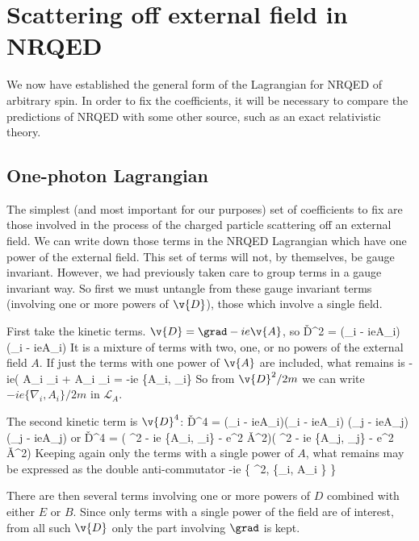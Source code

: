 


\section{Scattering off external field in NRQED}
We now have established the general form of the Lagrangian for NRQED of arbitrary spin.  In order to fix the coefficients, it will be necessary to compare the predictions of NRQED with some other source, such as an exact relativistic theory.


\subsection{One-photon Lagrangian}
The simplest (and most important for our purposes) set of coefficients to fix are those involved in the process of the charged particle scattering off an external field.  We can write down those terms in the NRQED Lagrangian which have one power of the external field.  This set of terms will not, by themselves, be gauge invariant.  However, we had previously taken care to group terms in a gauge invariant way.  So first we must untangle from these gauge invariant terms (involving one or more powers of $\v{D}$), those which involve a single field.


First take the kinetic terms.  $\v{D} = \grad - ie\v{A}$, so
\beq
	\v{D}^2 = (\nabla_i - ieA_i)(\nabla_i - ieA_i)
\eeq
It is a mixture of terms with two, one, or no powers of the external field $A$.  If just the terms with one power of $\v{A}$ are included, what remains is
\beq
	-ie( A_i \nabla_i + A_i \nabla_i = -ie \{A_i, \nabla_i\}
\eeq
So from $\v{D}^2/ 2m$ we can write $-ie \{\nabla_i, A_i\}/2m$ in  $\mathcal{L}_A$.

The second kinetic term is $\v{D}^4$:
\beq
	\v{D}^4 = (\nabla_i - ieA_i)(\nabla_i - ieA_i) (\nabla_j - ieA_j)(\nabla_j - ieA_j)
\eeq
or
\beq
	\v{D}^4 = ( \grad^2 - ie \{A_i, \nabla_i\} - e^2 \v{A}^2)( \grad^2 - ie \{A_j, \nabla_j\} - e^2 \v{A}^2)
\eeq
Keeping again only the terms with a single power of $A$, what remains may be expressed as the double anti-commutator
\beq
	-ie \{ \grad^2, \{\nabla_i, A_i \} \} 
\eeq

There are then several terms involving one or more powers of $D$ combined with either $E$ or $B$.  Since only terms with a single power of the field are of interest, from all such $\v{D}$ only the part involving $\grad$ is kept.



